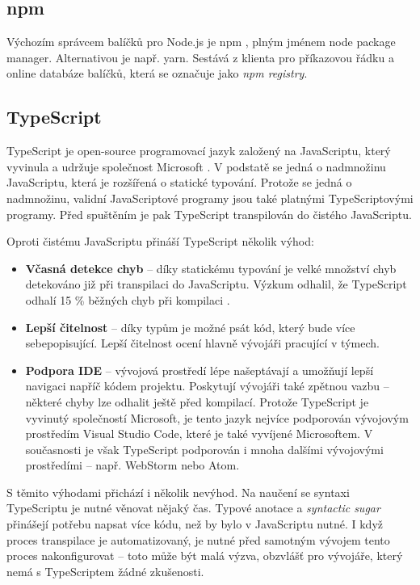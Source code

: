 \documentclass[thesis=M,czech]{FITthesis}[2019/12/23]
\begin{document}
\subsection{npm}
Výchozím správcem balíčků pro Node.js je npm \cite{npm}, plným jménem node package manager. Alternativou je např. yarn\cite{yarn}. Sestává z klienta pro příkazovou řádku a online databáze balíčků, která se označuje jako \textit{npm registry}.

\subsection{TypeScript}
TypeScript je open-source programovací jazyk založený na JavaScriptu, který vyvinula a udržuje společnost Microsoft \cite{typescript_2015}. V podstatě se jedná o nadmnožinu JavaScriptu, která je rozšířená o statické typování. Protože se jedná o nadmnožinu, validní JavaScriptové programy jsou také platnými TypeScriptovými programy. Před spuštěním je pak TypeScript transpilován do čistého JavaScriptu.

Oproti čistému JavaScriptu přináší TypeScript několik výhod:

\begin{itemize}
  \item \textbf{Včasná detekce chyb} -- díky statickému typování je velké množství chyb detekováno již při transpilaci do JavaScriptu. Výzkum odhalil, že TypeScript odhalí 15 \% běžných chyb při kompilaci \cite{typescript_bugs}.
  \item \textbf{Lepší čitelnost} -- díky typům je možné psát kód, který bude více sebepopisující. Lepší čitelnost ocení hlavně vývojáři pracující v týmech.
  \item \textbf{Podpora IDE} -- vývojová prostředí lépe našeptávají a umožňují lepší navigaci napříč kódem projektu. Poskytují vývojáři také zpětnou vazbu -- některé chyby lze odhalit ještě před kompilací. Protože TypeScript je vyvinutý společností Microsoft, je tento jazyk nejvíce podporován vývojovým prostředím Visual Studio Code, které je také vyvíjené Microsoftem. V současnosti je však TypeScript podporován i mnoha dalšími vývojovými prostředími -- např. WebStorm nebo Atom.
\end{itemize}

S těmito výhodami přichází i několik nevýhod. Na naučení se syntaxi TypeScriptu je nutné věnovat nějaký čas. Typové anotace a \textit{syntactic sugar} přinášejí potřebu napsat více kódu, než by bylo v JavaScriptu nutné. I když proces transpilace je automatizovaný, je nutné před samotným vývojem tento proces nakonfigurovat -- toto může být malá výzva, obzvlášť pro vývojáře, který nemá s TypeScriptem žádné zkušenosti.
\end{document}
